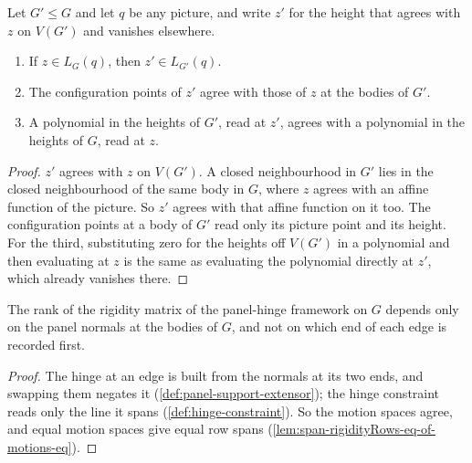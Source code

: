 \begin{lemma}
  \label{lem:pencil-lifting-restrict}
  \leanok
  Let $G' \le G$ and let $q$ be any picture, and write $z'$ for the
  height that agrees with $z$ on $V(G')$ and vanishes elsewhere.
  \begin{enumerate}
    \item If $z \in L_G(q)$, then $z' \in L_{G'}(q)$.
    \item The configuration points of $z'$ agree with those of $z$ at
      the bodies of $G'$.
    \item A polynomial in the heights of $G'$, read at $z'$, agrees
      with a polynomial in the heights of $G$, read at $z$.
  \end{enumerate}
\end{lemma}
\begin{proof}
  \leanok
  $z'$ agrees with $z$ on $V(G')$. A closed neighbourhood in
  $G'$ lies in the closed neighbourhood of the same body in $G$, where $z$
  agrees with an affine function of the picture. So $z'$
  agrees with that affine function on it too. The configuration points
  at a body of $G'$ read only its picture point and its height. For the
  third, substituting zero for the heights off $V(G')$ in a polynomial
  and then evaluating at $z$ is the same as evaluating the polynomial
  directly at $z'$, which already vanishes there.
\end{proof}

\begin{lemma}
  \label{lem:pencil-rank-congr}
  \leanok
  The rank of the rigidity matrix of the panel-hinge framework on $G$
  depends only on the panel normals at the bodies of $G$, and not on
  which end of each edge is recorded first.
\end{lemma}
\begin{proof}
  \leanok
  The hinge at an edge is built from the normals at its two ends, and
  swapping them negates it (\cref{def:panel-support-extensor}); the
  hinge constraint reads only the line it spans
  (\cref{def:hinge-constraint}). So the motion spaces agree, and equal
  motion spaces give equal row spans
  (\cref{lem:span-rigidityRows-eq-of-motions-eq}).
\end{proof}

